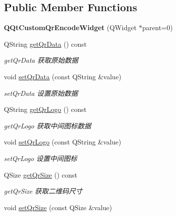 \subsection*{Public Member Functions}
\begin{DoxyCompactItemize}
\item 
\mbox{\label{class_q_qt_custom_qr_encode_widget_a9904175d853d9ac740ef49fb047345b5}} 
{\bfseries Q\+Qt\+Custom\+Qr\+Encode\+Widget} (Q\+Widget $\ast$parent=0)
\item 
Q\+String \mbox{\hyperlink{class_q_qt_custom_qr_encode_widget_a6ee24cde3d6e5ac059bac73354b8322e}{get\+Qr\+Data}} () const
\begin{DoxyCompactList}\small\item\em get\+Qr\+Data 获取原始数据 \end{DoxyCompactList}\item 
void \mbox{\hyperlink{class_q_qt_custom_qr_encode_widget_a83c26a62794769a7955c1921129754f9}{set\+Qr\+Data}} (const Q\+String \&value)
\begin{DoxyCompactList}\small\item\em set\+Qr\+Data 设置原始数据 \end{DoxyCompactList}\item 
Q\+String \mbox{\hyperlink{class_q_qt_custom_qr_encode_widget_a8b59eabe5796207d04e592cff249152f}{get\+Qr\+Logo}} () const
\begin{DoxyCompactList}\small\item\em get\+Qr\+Logo 获取中间图标数据 \end{DoxyCompactList}\item 
void \mbox{\hyperlink{class_q_qt_custom_qr_encode_widget_a1f536fe7c84f80ba7947e07f752bb8bb}{set\+Qr\+Logo}} (const Q\+String \&value)
\begin{DoxyCompactList}\small\item\em set\+Qr\+Logo 设置中间图标 \end{DoxyCompactList}\item 
Q\+Size \mbox{\hyperlink{class_q_qt_custom_qr_encode_widget_a7631297b67f4c7d0ca59f33aa8a6fa2b}{get\+Qr\+Size}} () const
\begin{DoxyCompactList}\small\item\em get\+Qr\+Size 获取二维码尺寸 \end{DoxyCompactList}\item 
void \mbox{\hyperlink{class_q_qt_custom_qr_encode_widget_a21b4fbb761bf2493e80abdba42a1b6ea}{set\+Qr\+Size}} (const Q\+Size \&value)

\end{DoxyCompactItemize}
